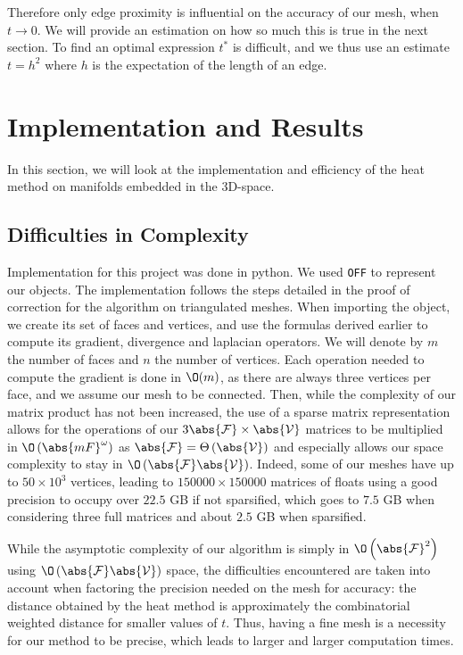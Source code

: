 \documentclass[math, info, english]{cours}
\def\mF{\mathcal{F}}
\def\mV{\mathcal{V}}
\begin{document}
Therefore only edge proximity is influential on the accuracy of our mesh, when $t \to 0$.
We will provide an estimation on how so much this is true in the next section.
To find an optimal expression $t^{*}$ is difficult, and we thus use an estimate $t = h^{2}$ where $h$ is the expectation of the length of an edge.

\section{Implementation and Results}
In this section, we will look at the implementation and efficiency of the heat method on manifolds embedded in the 3D-space.

\subsection{Difficulties in Complexity}
Implementation for this project was done in python. We used \texttt{OFF} to represent our objects.
The implementation follows the steps detailed in the proof of correction for the algorithm on triangulated meshes.
When importing the object, we create its set of faces and vertices, and use the formulas derived earlier to compute its gradient, divergence and laplacian operators.
We will denote by $m$ the number of faces and $n$ the number of vertices.
Each operation needed to compute the gradient is done in $\O(m)$, as there are always three vertices per face, and we assume our mesh to be connected.
Then, while the complexity of our matrix product has not been increased, the use of a sparse matrix representation allows for the operations of our $3\abs{\mF} \times \abs{\mV}$ matrices to be multiplied in $\O\left( \abs{mF}^{\omega} \right)$ as $\abs{\mF} = \Theta\left( \abs{\mV} \right)$ and especially allows our space complexity to stay in $\O\left( \abs{\mF}\abs{\mV} \right)$.
Indeed, some of our meshes have up to $50\times 10^{3}$ vertices, leading to $150000 \times 150000$ matrices of floats using a good precision to occupy over $22.5$ GB if not sparsified, which goes to $7.5$ GB when considering three full matrices and about $2.5$ GB when sparsified.

While the asymptotic complexity of our algorithm is simply in $\O\left( \abs{\mF}^{2} \right)$ using $\O\left( \abs{\mF}\abs{\mV} \right)$ space, the difficulties encountered are taken into account when factoring the precision
needed on the mesh for accuracy: the distance obtained by the heat method is approximately the combinatorial weighted distance for smaller values of $t$.
Thus, having a fine mesh is a necessity for our method to be precise, which leads to larger and larger computation times.
\end{document}
